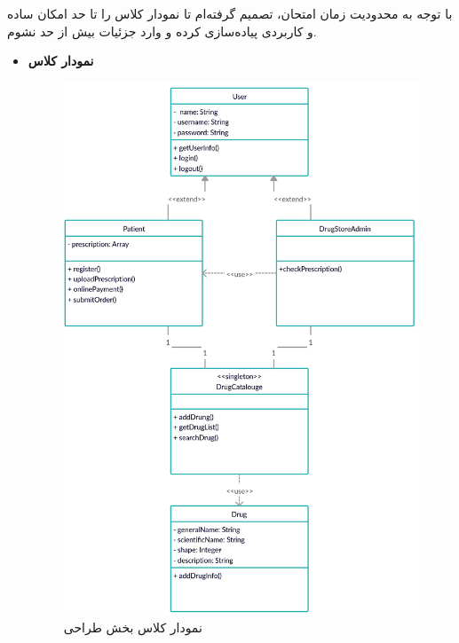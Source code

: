 با توجه به محدودیت زمان امتحان، تصمیم گرفته‌ام تا نمودار کلاس را تا حد امکان ساده و کاربردی پیاده‌سازی کرده و وارد جزئیات بیش از حد نشوم.
\begin{itemize}
	\item \textbf{ نمودار کلاس}
	
	\begin{figure}
		\begin{center}
			\includegraphics[scale=0.3]{./8.png}
			\caption{نمودار کلاس بخش طراحی}
		\end{center}
	\end{figure}
\end{itemize}